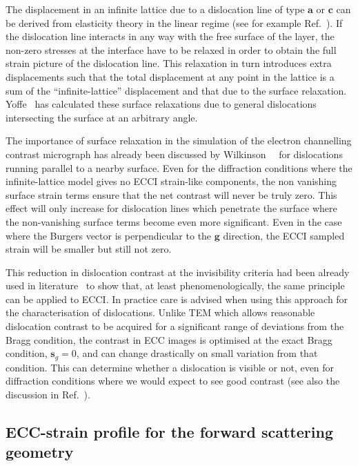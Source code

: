 The displacement in an infinite lattice due to a dislocation line of type $\mathbf{a}$ or $\mathbf{c}$ can be derived from elasticity theory in the linear regime (see for example Ref.~\cite{Read53}). If the dislocation line interacts in any way with the free surface of the layer, the non-zero stresses at the interface have to be relaxed in order to obtain the full strain picture of the dislocation line. This relaxation in turn introduces extra displacements such that the total displacement at any point in the lattice is a sum of the ``infinite-lattice'' displacement and that due to the surface relaxation. Yoffe~\cite{Yoffe} has calculated these surface relaxations due to general dislocations intersecting the surface at an arbitrary angle.

The importance of surface relaxation in the simulation of the electron channelling contrast micrograph has already been discussed by Wilkinson~\etal~\cite{Wilkinson95} for dislocations running parallel to a nearby surface. Even for the diffraction conditions where the infinite-lattice model gives no ECCI strain-like components, the non vanishing surface strain terms ensure that the net contrast will never be truly zero. This effect will only increase for dislocation lines which penetrate the surface where the non-vanishing surface terms become even more significant. Even in the case where the Burgers vector is perpendicular to the $\mathbf{g}$ direction, the ECCI sampled strain will be smaller but still not zero.

This reduction in dislocation contrast at the invisibility criteria had been already used in literature~\cite{Morin79, Crimp01} to show that, at least phenomenologically, the same principle can be applied to ECCI. In practice care is advised when using this approach for the characterisation of dislocations. Unlike TEM which allows reasonable dislocation contrast to be acquired for a significant range of deviations from the Bragg condition, the contrast in ECC images is optimised at the exact Bragg condition, $\mathbf{s}_g = 0$, and can change drastically on small variation from that condition. This can determine whether a dislocation is visible or not, even for diffraction conditions where we would expect to see good contrast (see also the discussion in Ref.~\cite{Crimp06}).


\subsection{ECC-strain profile for the forward scattering geometry}
\label{sec:tilteffect}

